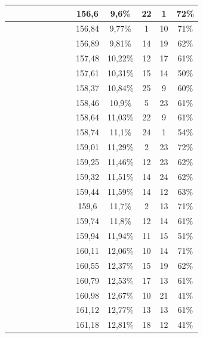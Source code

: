 \begin{center}
\begin{longtable}{|c|c|c|c|c|c|c|c|c|c|c|c|c|}
 \x &  &  &  &  &  \x &  \x &  \x & 156,6 & 9,6\% & 22 & 1 & 72\% \\ \hline
 \x &  &  \x &  &  \x &  \x &  \x &  \x & 156,84 & 9,77\% & 1 & 10 & 71\% \\ \hline
 \x &  &  \x &  &  &  &  \x &  \x & 156,89 & 9,81\% & 14 & 19 & 62\% \\ \hline
 \x &  \x &  &  \x &  \x &  &  \x &  \x & 157,48 & 10,22\% & 12 & 17 & 61\% \\ \hline
 \x &  &  &  \x &  &  &  \x &  \x & 157,61 & 10,31\% & 15 & 14 & 50\% \\ \hline
 \x &  &  &  \x &  \x &  &  &  \x & 158,37 & 10,84\% & 25 & 9 & 60\% \\ \hline
 \x &  \x &  &  &  \x &  &  \x &  \x & 158,46 & 10,9\% & 5 & 23 & 61\% \\ \hline
 \x &  \x &  &  \x &  \x &  &  &  \x & 158,64 & 11,03\% & 22 & 9 & 61\% \\ \hline
 \x &  \x &  &  &  &  &  \x &  \x & 158,74 & 11,1\% & 24 & 1 & 54\% \\ \hline
 \x &  \x &  &  &  \x &  \x &  \x &  \x & 159,01 & 11,29\% & 2 & 23 & 72\% \\ \hline
 \x &  &  \x &  &  \x &  &  \x &  \x & 159,25 & 11,46\% & 12 & 23 & 62\% \\ \hline
 \x &  \x &  \x &  \x &  \x &  &  \x &  \x & 159,32 & 11,51\% & 14 & 24 & 62\% \\ \hline
 \x &  \x &  \x &  &  \x &  &  \x &  \x & 159,44 & 11,59\% & 14 & 12 & 63\% \\ \hline
 \x &  &  \x &  &  &  \x &  \x &  \x & 159,6 & 11,7\% & 2 & 13 & 71\% \\ \hline
 \x &  \x &  \x &  &  \x &  &  &  \x & 159,74 & 11,8\% & 12 & 14 & 61\% \\ \hline
 \x &  &  &  \x &  &  &  \x &  \x & 159,94 & 11,94\% & 11 & 15 & 51\% \\ \hline
 \x &  \x &  &  \x &  &  \x &  \x &  \x & 160,11 & 12,06\% & 10 & 14 & 71\% \\ \hline
 \x &  \x &  \x &  \x &  \x &  &  &  \x & 160,55 & 12,37\% & 15 & 19 & 62\% \\ \hline
 \x &  &  &  &  \x &  &  \x &  \x & 160,79 & 12,53\% & 17 & 13 & 61\% \\ \hline
 \x &  &  &  &  &  &  \x &  \x & 160,98 & 12,67\% & 10 & 21 & 41\% \\ \hline
 \x &  \x &  &  \x &  \x &  &  \x &  \x & 161,12 & 12,77\% & 13 & 13 & 61\% \\ \hline
 \x &  &  &  &  &  &  \x &  \x & 161,18 & 12,81\% & 18 & 12 & 41\% \\ \hline

\end{longtable}
\end{center}
